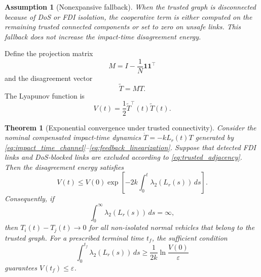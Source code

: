 \documentclass[lettersize,journal]{IEEEtran}
\newtheorem{assumption}{Assumption}
\newtheorem{theorem}{Theorem}
\begin{document}
\begin{assumption}[Nonexpansive fallback]
When the trusted graph is disconnected because of DoS or FDI isolation, the cooperative term is either computed on the remaining trusted connected components or set to zero on unsafe links. This fallback does not increase the impact-time disagreement energy.
\end{assumption}

Define the projection matrix
\begin{equation}
    M=I-\frac{1}{N}\mathbf{1}\mathbf{1}^{\top}
\end{equation}
and the disagreement vector
\begin{equation}
    \tilde T=MT.
\end{equation}
The Lyapunov function is
\begin{equation}
    V(t)=\frac{1}{2}\tilde T^{\top}(t)\tilde T(t).
    \label{eq:lyapunov}
\end{equation}

\begin{theorem}[Exponential convergence under trusted connectivity]
Consider the nominal compensated impact-time dynamics $\dot T=-kL_r(t)T$ generated by \eqref{eq:impact_time_channel}--\eqref{eq:feedback_linearization}. Suppose that detected FDI links and DoS-blocked links are excluded according to \eqref{eq:trusted_adjacency}. Then the disagreement energy satisfies
\begin{equation}
    V(t)
    \le
    V(0)
    \exp
    \left[
    -2k
    \int_0^t
    \lambda_2(L_r(s))\,ds
    \right].
    \label{eq:exp_bound}
\end{equation}
Consequently, if
\begin{equation}
    \int_0^\infty \lambda_2(L_r(s))\,ds=\infty,
    \label{eq:cumulative_connectivity}
\end{equation}
then $T_i(t)-T_j(t)\to0$ for all non-isolated normal vehicles that belong to the trusted graph. For a prescribed terminal time $t_f$, the sufficient condition
\begin{equation}
    \int_0^{t_f}
    \lambda_2(L_r(s))\,ds
    \ge
    \frac{1}{2k}\ln\frac{V(0)}{\varepsilon}
    \label{eq:finite_error_condition}
\end{equation}
guarantees $V(t_f)\le\varepsilon$.
\end{theorem}
\end{document}
